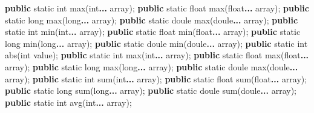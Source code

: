\documentclass[
]{book}
\newenvironment{Shaded}{\begin{snugshade}}{\end{snugshade}}
\newcommand{\DataTypeTok}[1]{\textcolor[rgb]{0.13,0.29,0.53}{#1}}
\newcommand{\FunctionTok}[1]{\textcolor[rgb]{0.00,0.00,0.00}{#1}}
\newcommand{\KeywordTok}[1]{\textcolor[rgb]{0.13,0.29,0.53}{\textbf{#1}}}
\newcommand{\NormalTok}[1]{#1}
\begin{document}
\begin{Shaded}
\begin{Highlighting}[]
\KeywordTok{public} \DataTypeTok{static} \DataTypeTok{int} \FunctionTok{max}\NormalTok{(}\DataTypeTok{int}\KeywordTok{... }\NormalTok{array);}
\KeywordTok{public} \DataTypeTok{static} \DataTypeTok{float} \FunctionTok{max}\NormalTok{(}\DataTypeTok{float}\KeywordTok{... }\NormalTok{array);}
\KeywordTok{public} \DataTypeTok{static} \DataTypeTok{long} \FunctionTok{max}\NormalTok{(}\DataTypeTok{long}\KeywordTok{... }\NormalTok{array);}
\KeywordTok{public} \DataTypeTok{static}\NormalTok{ doule }\FunctionTok{max}\NormalTok{(doule}\KeywordTok{... }\NormalTok{array);}
\KeywordTok{public} \DataTypeTok{static} \DataTypeTok{int} \FunctionTok{min}\NormalTok{(}\DataTypeTok{int}\KeywordTok{... }\NormalTok{array);}
\KeywordTok{public} \DataTypeTok{static} \DataTypeTok{float} \FunctionTok{min}\NormalTok{(}\DataTypeTok{float}\KeywordTok{... }\NormalTok{array);}
\KeywordTok{public} \DataTypeTok{static} \DataTypeTok{long} \FunctionTok{min}\NormalTok{(}\DataTypeTok{long}\KeywordTok{... }\NormalTok{array);}
\KeywordTok{public} \DataTypeTok{static}\NormalTok{ doule }\FunctionTok{min}\NormalTok{(doule}\KeywordTok{... }\NormalTok{array);}
\KeywordTok{public} \DataTypeTok{static} \DataTypeTok{int} \FunctionTok{abs}\NormalTok{(}\DataTypeTok{int}\NormalTok{ value);}
\KeywordTok{public} \DataTypeTok{static} \DataTypeTok{int} \FunctionTok{max}\NormalTok{(}\DataTypeTok{int}\KeywordTok{... }\NormalTok{array);}
\KeywordTok{public} \DataTypeTok{static} \DataTypeTok{float} \FunctionTok{max}\NormalTok{(}\DataTypeTok{float}\KeywordTok{... }\NormalTok{array);}
\KeywordTok{public} \DataTypeTok{static} \DataTypeTok{long} \FunctionTok{max}\NormalTok{(}\DataTypeTok{long}\KeywordTok{... }\NormalTok{array);}
\KeywordTok{public} \DataTypeTok{static}\NormalTok{ doule }\FunctionTok{max}\NormalTok{(doule}\KeywordTok{... }\NormalTok{array);}
\KeywordTok{public} \DataTypeTok{static} \DataTypeTok{int} \FunctionTok{sum}\NormalTok{(}\DataTypeTok{int}\KeywordTok{... }\NormalTok{array);}
\KeywordTok{public} \DataTypeTok{static} \DataTypeTok{float} \FunctionTok{sum}\NormalTok{(}\DataTypeTok{float}\KeywordTok{... }\NormalTok{array);}
\KeywordTok{public} \DataTypeTok{static} \DataTypeTok{long} \FunctionTok{sum}\NormalTok{(}\DataTypeTok{long}\KeywordTok{... }\NormalTok{array);}
\KeywordTok{public} \DataTypeTok{static}\NormalTok{ doule }\FunctionTok{sum}\NormalTok{(doule}\KeywordTok{... }\NormalTok{array);}
\KeywordTok{public} \DataTypeTok{static} \DataTypeTok{int} \FunctionTok{avg}\NormalTok{(}\DataTypeTok{int}\KeywordTok{... }\NormalTok{array);}

\end{Highlighting}
\end{Shaded}
\end{document}
